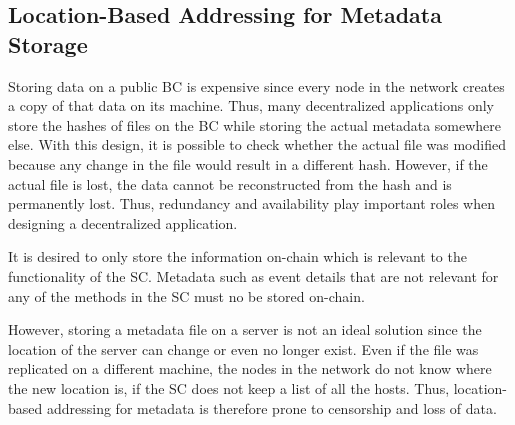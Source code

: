 
\subsection{Location-Based Addressing for Metadata Storage}\label{subsection:metadata-storage}

Storing data on a public BC is expensive since every node in the network creates a copy of that data on its machine. Thus, many decentralized applications only store the hashes of files on the BC while storing the actual metadata somewhere else. With this design, it is possible to check whether the actual file was modified because any change in the file would result in a different hash. However, if the actual file is lost, the data cannot be reconstructed from the hash and is permanently lost. Thus, redundancy and availability play important roles when designing a decentralized application.

It is desired to only store the information on-chain which is relevant to the functionality of the SC. Metadata such as event details that are not relevant for any of the methods in the SC must no be stored on-chain.

However, storing a metadata file on a server is not an ideal solution since the location of the server can change or even no longer exist. Even if the file was replicated on a different machine, the nodes in the network do not know where the new location is, if the SC does not keep a list of all the hosts. Thus, location-based addressing for metadata is therefore prone to censorship and loss of data. 
